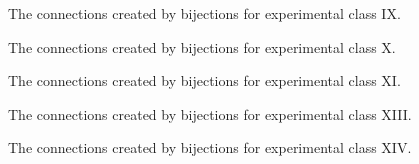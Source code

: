 \begin{comment}
\begin{figure}[ht!]
    \centering
    
    \caption{The connections created by bijections for experimental class VIII.}
    \label{fig:expgrp_VIII}
\end{figure}
\end{comment}


\begin{figure}[ht!]
    \centering
    
    \caption{The connections created by bijections for experimental class IX.}
    \label{fig:expgrp_IX}
\end{figure}


\begin{figure}[ht!]
    \centering
    
    \caption{The connections created by bijections for experimental class X.}
    \label{fig:expgrp_X}
\end{figure}


\begin{figure}[ht!]
    \centering
    
    \caption{The connections created by bijections for experimental class XI.}
    \label{fig:expgrp_XI}
\end{figure}


\begin{comment}
\begin{figure}[ht!]
    \centering
    
    \caption{The connections created by bijections for experimental class XII.}
    \label{fig:expgrp_XII}
\end{figure}
\end{comment}


\begin{figure}[ht!]
    \centering
    
    \caption{The connections created by bijections for experimental class XIII.}
    \label{fig:expgrp_XIII}
\end{figure}


\begin{figure}[ht!]
    \centering
    
    \caption{The connections created by bijections for experimental class XIV.}
    \label{fig:expgrp_XIV}
\end{figure}


